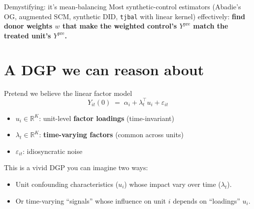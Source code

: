 \documentclass[handout,xcolor=dvipsnames,pdftex,hyperref={colorlinks=false}]{beamer}
\newcommand\makegaps{\addtolength{\itemsep}{.25\baselineskip}}
\newcommand{\Ypre}{Y^{\text{pre}}}        %
\begin{document}
\begin{frame}{Demystifying: it's mean-balancing}
Most synthetic-control estimators (Abadie's OG, augmented SCM, synthetic DID, \texttt{tjbal} with linear kernel) effectively: \textbf{find donor weights $w$ that make the weighted control's $\Ypre$ match the treated unit's $\Ypre$.}\\[2ex]
\end{frame}

\section{A DGP we can reason about}

\begin{frame}{Pretend we believe the linear factor model}
\[
Y_{it}(0) \;=\; \alpha_i + \lambda_t^\top u_i + \varepsilon_{it}
\]
\small

\begin{itemize}\makegaps
  \item<2-> $u_i \in \mathbb{R}^K$: unit-level \textbf{factor loadings} (time-invariant)
  \item<3-> $\lambda_t \in \mathbb{R}^K$: \textbf{time-varying factors} (common across units)
  \item<4-> $\varepsilon_{it}$: idiosyncratic noise
\end{itemize}
\bigskip
\normalsize
{} This is a vivid DGP you can imagine two ways:\\

\small
\begin{itemize}
\item Unit confounding characteristics ($u_i$) whose impact vary over time ($\lambda_t$).
\item Or time-varying ``signals'' whose influence on unit $i$ depends on ``loadings'' $u_i$.
\end{itemize}
\end{frame}
\end{document}
